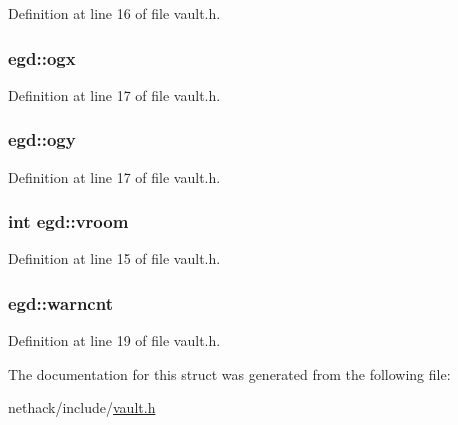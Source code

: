 Definition at line 16 of file vault.\+h.

\hypertarget{structegd_a87fb943de89433c04a2e66fe7d4a75d3}{
\subsubsection[{ogx}]{ egd\+::ogx}}\label{structegd_a87fb943de89433c04a2e66fe7d4a75d3}


Definition at line 17 of file vault.\+h.

\hypertarget{structegd_aaceb7f37f78271231d109e31bd144bd0}{
\subsubsection[{ogy}]{ egd\+::ogy}}\label{structegd_aaceb7f37f78271231d109e31bd144bd0}


Definition at line 17 of file vault.\+h.

\hypertarget{structegd_a28b49224a9c6d896fc2302f3cf5fc9cf}{
\subsubsection[{vroom}]{\setlength{\rightskip}{0pt plus 5cm}int egd\+::vroom}}\label{structegd_a28b49224a9c6d896fc2302f3cf5fc9cf}


Definition at line 15 of file vault.\+h.

\hypertarget{structegd_af76108308738faac83e3272e2512df58}{
\subsubsection[{warncnt}]{ egd\+::warncnt}}\label{structegd_af76108308738faac83e3272e2512df58}


Definition at line 19 of file vault.\+h.



The documentation for this struct was generated from the following file\+:\begin{DoxyCompactItemize}
\item 
nethack/include/\hyperlink{vault_8h}{vault.\+h}\end{DoxyCompactItemize}
